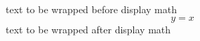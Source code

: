 text to 
    be
 wrapped before display math
 \[ y = x\]
text to 
    be
 wrapped after display math
